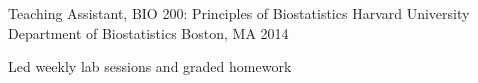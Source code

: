\begin{cventries}
  \cventry
    {Teaching Assistant, BIO 200: Principles of Biostatistics} %
    {Harvard University Department of Biostatistics} %
    {Boston, MA} %
    {2014} %
    {
      \begin{cvitems} %
        \item {Led weekly lab sessions and graded homework}
      \end{cvitems}
    }
\end{cventries}
